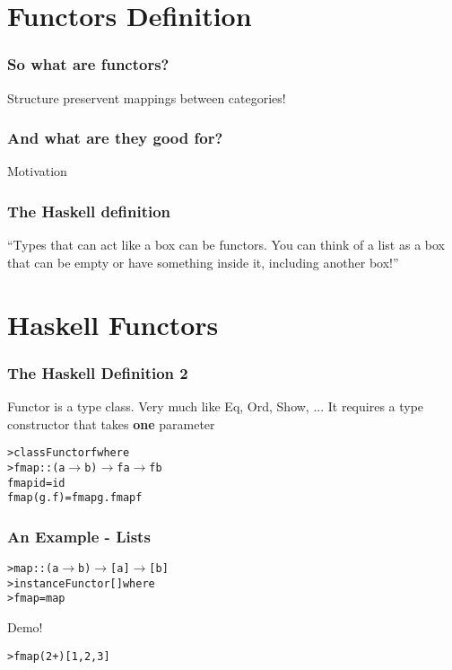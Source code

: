 \documentclass[12pt, xcolor=table]{beamer}
\begin{document}
\section{Functors Definition}
\begin{frame}
    \frametitle{So what are functors?}
    Structure preservent mappings between categories!
\end{frame}

\begin{frame}
    \frametitle{And what are they good for?}
    Motivation

\end{frame}

\begin{frame}
    \frametitle{The Haskell definition}
    ``Types that can act like a box can be functors. You can think of a list as a box that can be empty or have something inside it, including another box!''
\end{frame}

\section{Haskell Functors}
\begin{frame}
    \frametitle{The Haskell Definition 2}
    Functor is a type class. Very much like Eq, Ord, Show, ...
    It requires a type constructor that takes \textbf{one} parameter

    \begin{alltt}
        > class  Functor    f   where \\
        >       fmap         ::   (a $\to$ b) $\to$ f a $\to$ f b
               \newline
               \newline
        fmap id           =  id \\
        fmap (g . f)      =  fmap g . fmap f
    \end{alltt}
\end{frame}

\begin{frame}
    \frametitle{An Example - Lists}

    \begin{alltt}
        > map :: (a $\to$ b) $\to$ [a] $\to$ [b] \\
        > instance Functor [] where \\
        >   fmap = map
    \end{alltt}

    \begin{block}{Demo!}
        \begin{alltt}
            > fmap (2 +) [1,2,3]
        \end{alltt}
    \end{block}
\end{frame}
\end{document}
